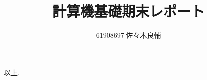 \documentclass[uplatex,a4j,11pt]{jsarticle}
\begin{document}
\title{計算機基礎期末レポート}
\author{61908697 佐々木良輔}
\maketitle
\newpage





\newpage



\newpage
以上.

\end{document}
